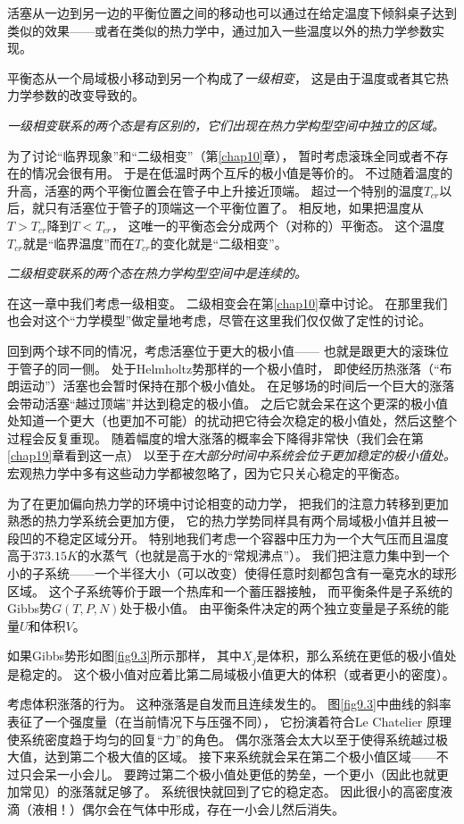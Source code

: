 活塞从一边到另一边的平衡位置之间的移动也可以通过在给定温度下倾斜桌子达到类似的效果——或者在类似的热力学中，通过加入一些温度以外的热力学参数实现。

平衡态从一个局域极小移动到另一个构成了{\it 一级相变}，
这是由于温度或者其它热力学参数的改变导致的。

{\it 一级相变联系的两个态是有区别的，它们出现在热力学构型空间中独立的区域。}

为了讨论“临界现象”和“二级相变”（第\ref{chap10}章），
暂时考虑滚珠全同或者不存在的情况会很有用。
于是在低温时两个互斥的极小值是等价的。
不过随着温度的升高，活塞的两个平衡位置会在管子中上升接近顶端。
超过一个特别的温度$T_{cr}$以后，就只有活塞位于管子的顶端这一个平衡位置了。
相反地，如果把温度从$T>T_{cr}$降到$T<T_{cr}$，
这唯一的平衡态会分成两个（对称的）平衡态。
这个温度$T_{cr}$就是“临界温度”而在$T_{cr}$的变化就是“二级相变”。

{\it 二级相变联系的两个态在热力学构型空间中是连续的。}

在这一章中我们考虑一级相变。
二级相变会在第\ref{chap10}章中讨论。
在那里我们也会对这个“力学模型”做定量地考虑，尽管在这里我们仅仅做了定性的讨论。

回到两个球不同的情况，考虑活塞位于更大的极小值——
也就是跟更大的滚珠位于管子的同一侧。
处于Helmholtz势那样的一个极小值时，
即使经历热涨落（“布朗运动”）活塞也会暂时保持在那个极小值处。
在足够场的时间后一个巨大的涨落会带动活塞“越过顶端”并达到稳定的极小值。
之后它就会呆在这个更深的极小值处知道一个更大（也更加不可能）的扰动把它待会次稳定的极小值处，然后这整个过程会反复重现。
随着幅度的增大涨落的概率会下降得非常快（我们会在第\ref{chap19}章看到这一点）
以至于{\it 在大部分时间中系统会位于更加稳定的极小值处。}
宏观热力学中多有这些动力学都被忽略了，因为它只关心稳定的平衡态。

为了在更加偏向热力学的环境中讨论相变的动力学，
把我们的注意力转移到更加熟悉的热力学系统会更加方便，
它的热力学势同样具有两个局域极小值并且被一段凹的不稳定区域分开。
特别地我们考虑一个容器中压力为一个大气压而且温度高于$373.15K$的水蒸气（也就是高于水的“常规沸点”）。
我们把注意力集中到一个小的子系统——一个半径大小（可以改变）使得任意时刻都包含有一毫克水的球形区域。
这个子系统等价于跟一个热库和一个蓄压器接触，
而平衡条件是子系统的Gibbs势$G(T,P,N)$处于极小值。
由平衡条件决定的两个独立变量是子系统的能量$U$和体积$V$。

如果Gibbs势形如图\ref{fig9.3}所示那样，
其中$X_j$是体积，那么系统在更低的极小值处是稳定的。
这个极小值对应着比第二局域极小值更大的体积（或者更小的密度）。

考虑体积涨落的行为。
这种涨落是自发而且连续发生的。
图\ref{fig9.3}中曲线的斜率表征了一个强度量（在当前情况下与压强不同），
它扮演着符合Le Chatelier 原理使系统密度趋于均匀的回复“力”的角色。
偶尔涨落会太大以至于使得系统越过极大值，达到第二个极大值的区域。
接下来系统就会呆在第二个极小值区域——不过只会呆一小会儿。
要跨过第二个极小值处更低的势垒，一个更小（因此也就更加常见）的涨落就足够了。
系统很快就回到了它的稳定态。
因此很小的高密度液滴（液相！）偶尔会在气体中形成，存在一小会儿然后消失。

